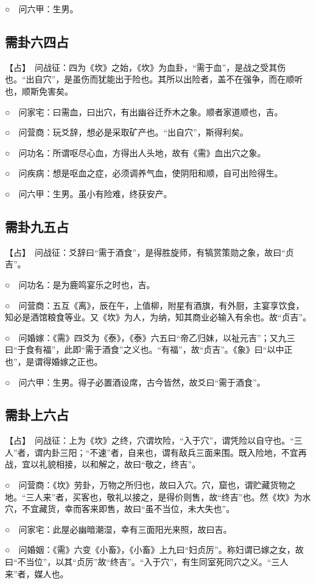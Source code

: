 \documentclass[12pt,oneside]{book}
\begin{document}
○　问六甲：生男。

\subsection{需卦六四占}
【占】　问战征：四为《坎》之始，《坎》为血卦，“需于血”，是战之受其伤也。“出自穴”，是虽伤而犹能出于险也。其所以出险者，盖不在强争，而在顺听也，顺斯免害矣。

○　问家宅：曰需血，曰出穴，有出幽谷迁乔木之象。顺者家道顺也，吉。

○　问营商：玩爻辞，想必是采取矿产也。“出自穴”，斯得利矣。

○　问功名：所谓呕尽心血，方得出人头地，故有《需》血出穴之象。

○　问疾病：想是呕血之症，必须调养气血，使阴阳和顺，自可出险得生。

○　问六甲：生男。虽小有险难，终获安产。
\subsection{需卦九五占}
【占】　问战征：爻辞曰“需于酒食”，是得胜旋师，有犒赏策勋之象，故曰“贞吉”。

○　问功名：是为鹿鸣宴乐之时也，吉。

○　问营商：五互《离》，辰在午，上值柳，附星有酒旗，有外厨，主宴享饮食，知必是酒馆粮食等业。又《坎》为人，为纳，知其商业必输入有余也。故“贞吉”。

○　问婚嫁：《需》四爻为《泰》，《泰》六五曰“帝乙归妹，以祉元吉”；又九三曰“于食有福”，此即“需于酒食”之义也。“有福”，故“贞吉”。《象》曰“以中正也”，是谓得婚嫁之正也。

○　问六甲：生男。得子必置酒设席，古今皆然，故爻曰“需于酒食”。

\subsection{需卦上六占}
【占】　问战征：上为《坎》之终，穴谓坎险，“入于穴”，谓凭险以自守也。“三人”者，谓内卦三阳；“不速”者，自来也，谓有敌兵三面来围。既入险地，不宜再战，宜以礼貌相接，以和解之，故曰“敬之，终吉”。

○　问营商：《坎》劳卦，万物之所归也，故曰入穴。穴，窟也，谓贮藏货物之地。“三人来”者，买客也，敬礼以接之，是得价则售，故“终吉”也。然《坎》为水穴，不宜藏货，幸而客来即售，故曰“虽不当位，未大失也”。

○　问家宅：此屋必幽暗潮湿，幸有三面阳光来照，故曰吉。

○　问婚姻：《需》六变《小畜》，《小畜》上九曰“妇贞厉”。称妇谓已嫁之女，故曰“不当位”，以其“贞厉”故“终吉”。“入于穴”，有生同室死同穴之义。“三人来”者，媒人也。
\end{document}
